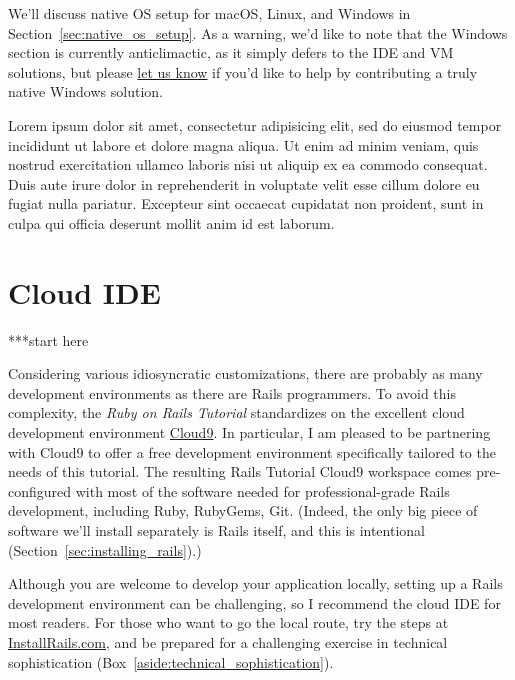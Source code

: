 We'll discuss native OS setup for macOS, Linux, and Windows in Section~\ref{sec:native_os_setup}. As a warning, we'd like to note that the Windows section is currently anticlimactic, as it simply defers to the IDE and VM solutions, but please \href{mailto:support@learnenough.com}{let us know} if you'd like to help by contributing a truly native Windows solution.

\begin{aside}
\label{aside:technical_sophistication}

Lorem ipsum dolor sit amet, consectetur adipisicing elit, sed do eiusmod
tempor incididunt ut labore et dolore magna aliqua. Ut enim ad minim veniam,
quis nostrud exercitation ullamco laboris nisi ut aliquip ex ea commodo
consequat. Duis aute irure dolor in reprehenderit in voluptate velit esse
cillum dolore eu fugiat nulla pariatur. Excepteur sint occaecat cupidatat non
proident, sunt in culpa qui officia deserunt mollit anim id est laborum.

\end{aside}




\section{Cloud IDE}
\label{sec:cloud_ide}

***start here

Considering various idiosyncratic customizations, there are probably as many development environments as there are Rails programmers. To avoid this complexity, the \emph{Ruby on Rails Tutorial} standardizes on the excellent cloud development environment \href{http://c9.io/}{Cloud9}. In particular, I am pleased to be partnering with Cloud9 to offer a free development environment specifically tailored to the needs of this tutorial. The resulting Rails Tutorial Cloud9 workspace comes pre-configured with most of the software needed for professional-grade Rails development, including Ruby, RubyGems, Git. (Indeed, the only big piece of software we'll install separately is Rails itself, and this is intentional (Section~\ref{sec:installing_rails}).)

Although you are welcome to develop your application locally, setting up a Rails development environment can be challenging, so I recommend the cloud IDE for most readers. For those who want to go the local route, try the steps at \href{http://installrails.com/}{InstallRails.com}, and be prepared for a challenging exercise in technical sophistication (Box~\ref{aside:technical_sophistication}).


